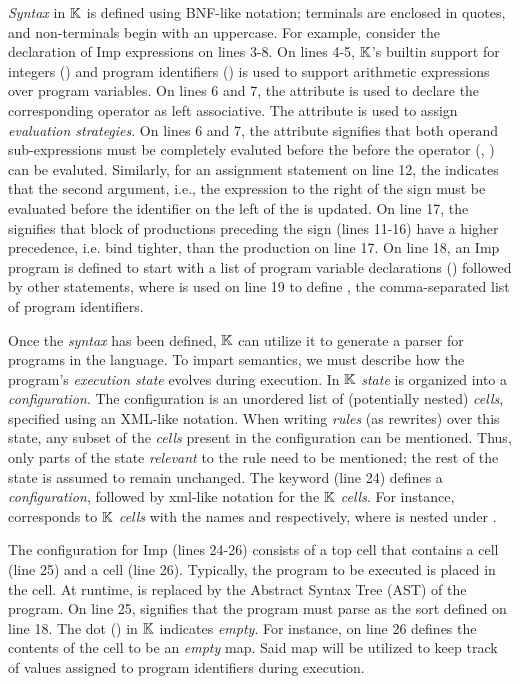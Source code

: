 \emph{Syntax} in $\mathbb{K}{}$ is defined using BNF-like notation; terminals are enclosed
in quotes, and non-terminals begin with an uppercase. For example,
consider the declaration of Imp expressions on lines 3-8. On lines 4-5,
$\mathbb{K}$'s builtin support for integers () and program identifiers
() is used to support arithmetic expressions over program variables.
On lines 6 and 7, the attribute  is used to declare the
corresponding operator as left associative. The  attribute is used
to assign \emph{evaluation strategies}. On lines 6 and 7, the attribute
signifies that both operand sub-expressions must be completely evaluted before the
before the operator (\inlinek{+}, \inlinek{-}) can be evaluted. Similarly, for
an assignment statement on line 12,
the  indicates that the second argument, i.e., the
expression to the right of the \inlineimp{=} sign must be evaluated before
the identifier on the left of the \inlineimp{=} is updated. On line 17,
the \inlinek{>} signifies that block of  productions preceding
the sign (lines 11-16) have a higher precedence, i.e. bind tighter,
than the production on line 17.
On line 18, an Imp program is defined to start with a list of program variable
declarations () followed by other statements, where
  is used on line 19 to define , the comma-separated list of
program identifiers.

Once the \emph{syntax} has been defined, $\mathbb{K}$ can utilize it to generate a
parser for programs in the language. To impart semantics,
we must describe how the program's \emph{execution state} evolves during
execution. In $\mathbb{K}$ \emph{state} is organized into a \emph{configuration}.
The configuration is an unordered list of (potentially nested) \emph{cells},
specified using an XML-like notation. When writing \emph{rules} (as rewrites)
over this state, any subset of the \emph{cells} present in the configuration
can be mentioned. Thus, only parts of the state \emph{relevant} to the rule
need to be mentioned; the rest of the state is assumed to remain unchanged.
The keyword  (line 24)  defines a \emph{configuration},
followed by xml-like notation for the $\mathbb{K}$ \emph{cells}. For instance,
 corresponds to $\mathbb{K}$ \emph{cells} with
the names  and  respectively, where 
is nested under .

The configuration for Imp (lines 24-26) consists of a top cell 
that contains a  cell (line 25) and a  cell (line 26).
Typically,
the program to be executed is placed in the  cell. At
runtime,  is replaced by the Abstract Syntax Tree (AST) of the program.
On line 25,  signifies that the program must parse as the
sort  defined on line 18. The dot () in $\mathbb{K}$
indicates \emph{empty}. For instance,  on line 26 defines
the contents of the  cell to be an \emph{empty} map.
Said map will be utilized to keep track of values assigned to program
identifiers during execution.


